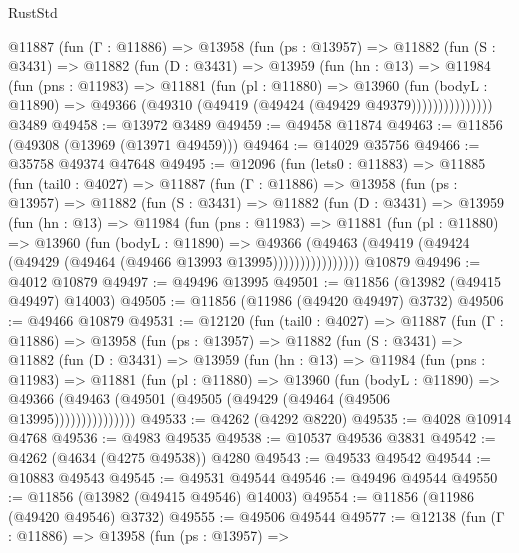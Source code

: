 \begin{lexlean}{RustStd}
\begin{coremodule}
        @11887
          (fun (Γ : @11886) =>
          @13958
            (fun (ps : @13957) =>
            @11882
              (fun (S : @3431) =>
              @11882
                (fun (D : @3431) =>
                @13959
                  (fun (hn : @13) =>
                  @11984
                    (fun (pns : @11983) =>
                    @11881
                      (fun (pl : @11880) =>
                      @13960
                        (fun (bodyL : @11890) =>
                        @49366 (@49310 (@49419 (@49424 (@49429 @49379)))))))))))))))
    @3489
@49458 := @13972 @3489
@49459 := @49458 @11874
@49463 := @11856 (@49308 (@13969 (@13971 @49459)))
@49464 := @14029 @35756
@49466 := @35758 @49374 @47648
@49495 := @12096
    (fun (lets0 : @11883) =>
    @11885
      (fun (tail0 : @4027) =>
      @11887
        (fun (Γ : @11886) =>
        @13958
          (fun (ps : @13957) =>
          @11882
            (fun (S : @3431) =>
            @11882
              (fun (D : @3431) =>
              @13959
                (fun (hn : @13) =>
                @11984
                  (fun (pns : @11983) =>
                  @11881
                    (fun (pl : @11880) =>
                    @13960
                      (fun (bodyL : @11890) =>
                      @49366
                        (@49463
                          (@49419 (@49424 (@49429 (@49464 (@49466 @13993 @13995))))))))))))))))
    @10879
@49496 := @4012 @10879
@49497 := @49496 @13995
@49501 := @11856 (@13982 (@49415 @49497) @14003)
@49505 := @11856 (@11986 (@49420 @49497) @3732)
@49506 := @49466 @10879
@49531 := @12120
    (fun (tail0 : @4027) =>
    @11887
      (fun (Γ : @11886) =>
      @13958
        (fun (ps : @13957) =>
        @11882
          (fun (S : @3431) =>
          @11882
            (fun (D : @3431) =>
            @13959
              (fun (hn : @13) =>
              @11984
                (fun (pns : @11983) =>
                @11881
                  (fun (pl : @11880) =>
                  @13960
                    (fun (bodyL : @11890) =>
                    @49366 (@49463 (@49501 (@49505 (@49429 (@49464 (@49506 @13995)))))))))))))))
@49533 := @4262 (@4292 @8220)
@49535 := @4028 @10914 @4768
@49536 := @4983 @49535
@49538 := @10537 @49536 @3831
@49542 := @4262 (@4634 (@4275 @49538)) @4280
@49543 := @49533 @49542
@49544 := @10883 @49543
@49545 := @49531 @49544
@49546 := @49496 @49544
@49550 := @11856 (@13982 (@49415 @49546) @14003)
@49554 := @11856 (@11986 (@49420 @49546) @3732)
@49555 := @49506 @49544
@49577 := @12138
    (fun (Γ : @11886) =>
    @13958
      (fun (ps : @13957) =>

\end{coremodule}
\end{lexlean}
